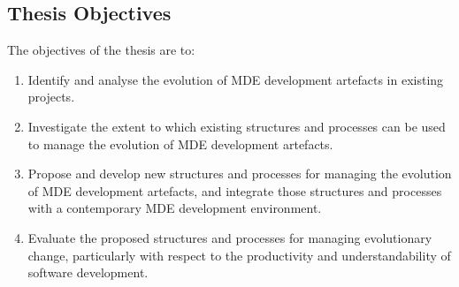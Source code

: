 \subsection{Thesis Objectives}
The objectives of the thesis are to:

\begin{enumerate}
	\item Identify and analyse the evolution of MDE development artefacts in existing projects.
	\item Investigate the extent to which existing structures and processes can be used to manage the evolution of MDE development artefacts. 
	\item Propose and develop new structures and processes for managing the evolution of MDE development artefacts, and integrate those structures and processes with a contemporary MDE development environment.
	\item Evaluate the proposed structures and processes for managing evolutionary change, particularly with respect to the productivity and understandability of software development.
\end{enumerate}
